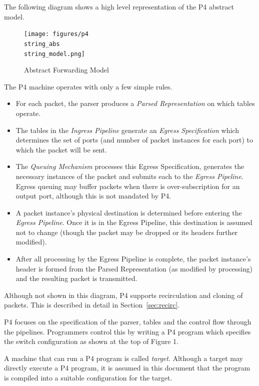 \documentclass[12pt]{article}
\begin{document}
The following diagram shows a high level representation of the P4 abstract 
model.

\begin{figure}[h!]
    \centering
    \texttt{[image: figures/p4\\string\_abs\\string\_model.png]}
    \caption{Abstract Forwarding Model}
    \label{fig:abstractmodel}
\end{figure}

The P4 machine operates with only a few simple rules. 

\begin{itemize}
\item
For each packet, the parser produces a \textit{Parsed Representation}
on which \matchaction tables operate.
\item
The \matchaction tables in the \textit{Ingress Pipeline} generate an
\textit{Egress Specification }which determines the set of ports (and
number of packet instances for each port) to which the packet will be
sent.
\item
The \textit{Queuing Mechanism} processes this Egress Specification,
generates the necessary instances of the packet and submits each to
the \textit{Egress Pipeline}.  Egress queuing may buffer packets when
there is over-subscription for an output port, although this is not
mandated by P4.
\item
A packet instance's physical destination is determined before entering
the \textit{Egress Pipeline}.  Once it is in the Egress Pipeline, this
destination is assumed not to change (though the packet may be dropped
or its headers further modified).
\item
After all processing by the Egress Pipeline is complete, the packet
instance's header is formed from the Parsed Representation (as
modified by \matchaction processing) and the resulting packet is
transmitted.
\end{itemize}


Although not shown in this diagram, P4 supports recirculation and cloning 
of packets.  This is described in detail in Section~\ref{sec:recirc}.

P4 focuses on the specification of the parser, \matchaction tables and the 
control flow through the pipelines. Programmers control this by writing a 
P4 program which specifies the switch configuration as shown at the top of 
Figure 1. 

A machine that can run a P4 program is called \textit{target}. Although a target 
may directly execute a P4 program, it is assumed in this document that the 
program is compiled into a suitable configuration for the target.
\end{document}
